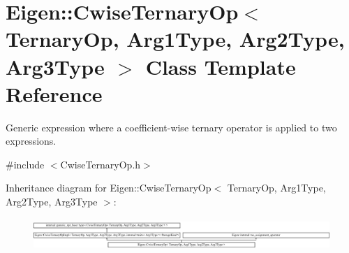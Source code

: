 \hypertarget{class_eigen_1_1_cwise_ternary_op}{}\section{Eigen\+::Cwise\+Ternary\+Op$<$ Ternary\+Op, Arg1\+Type, Arg2\+Type, Arg3\+Type $>$ Class Template Reference}
\label{class_eigen_1_1_cwise_ternary_op}


Generic expression where a coefficient-\/wise ternary operator is applied to two expressions.  




{\ttfamily \#include $<$Cwise\+Ternary\+Op.\+h$>$}

Inheritance diagram for Eigen\+::Cwise\+Ternary\+Op$<$ Ternary\+Op, Arg1\+Type, Arg2\+Type, Arg3\+Type $>$\+:\begin{figure}[H]
\begin{center}
\leavevmode
\includegraphics[height=1.206897cm]{class_eigen_1_1_cwise_ternary_op}
\end{center}
\end{figure}
